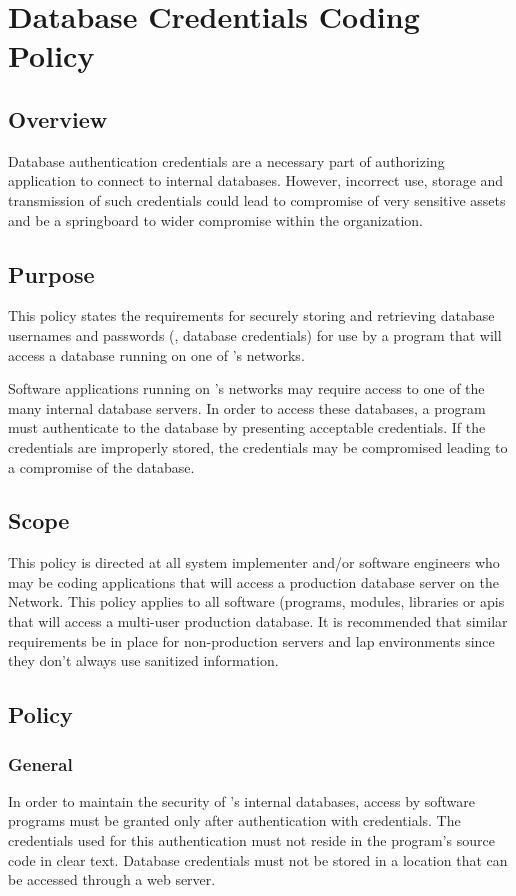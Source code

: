 \chapter{Database Credentials Coding Policy}
\CommonIntroduction
\section{Overview}
Database authentication credentials are a necessary part of authorizing application to connect to internal databases.  
However, incorrect use, storage\oxford{} and transmission of such credentials could lead to compromise of very sensitive assets and be a springboard to wider compromise within the organization. 
\section{Purpose}
This policy states the requirements for securely storing and retrieving database usernames and passwords (\ie, database credentials) for use by a program that will access a database running on one of \CompanyName{}'s networks. 

Software applications running on \CompanyName{}'s networks may require access to one of the many internal database servers. In order to access these databases, a program must authenticate to the database by presenting acceptable credentials.  
If the credentials are improperly stored, the credentials may be compromised leading to a compromise of the database. 
\section{Scope}
This policy is directed at all system implementer and/or software engineers who may be coding applications that will access a production database server on the \CompanyName{} Network.  
This policy applies to all software (programs, modules, libraries\oxford{} or \glspl{api}\ins{)} that will access a \CompanyName{}\del{,} multi-user production database.  
It is recommended that similar requirements be in place for non-production servers and lap environments since they don't always use sanitized information. 

\section{Policy}
\subsection{General}
In order to maintain the security of \CompanyName{}'s internal databases, access by software programs must be granted only after authentication with credentials.  
The credentials used for this authentication must not reside in  the program's source code in clear text.  
Database credentials must not be stored in a location that can be accessed through a web server. 

